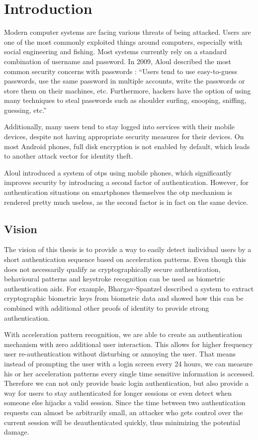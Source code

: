 \chapter{Introduction}\label{chapter:introduction}
Modern computer systems are facing various threats of being attacked. Users are one of the most commonly exploited things around computers, especially with social engineering and fishing. Most systems currently rely on a standard combination of username and password. In 2009, Aloul \etal described the most common security concerns with passwords \cite{aloul2009two}:
``Users tend to use easy-to-guess passwords, use the same password in multiple accounts, write the passwords or store them on their machines, etc. Furthermore, hackers have the option of using many techniques to steal passwords such as shoulder surfing, snooping, sniffing, guessing, etc.''

Additionally, many users tend to stay logged into services with their mobile devices, despite not having appropriate security measures for their devices. On most Android phones, full disk encryption is not enabled by default, which leads to another attack vector for identity theft.

Aloul \etal introduced a system of \glspl{otp} using mobile phones, which significantly improves security by introducing a second factor of authentication. However, for authentication situations on smartphones themselves the \gls{otp} mechanism is rendered pretty much useless, as the second factor is in fact on the same device.

\section{Vision}
The vision of this thesis is to provide a way to easily detect individual users by a short authentication sequence based on acceleration patterns. Even though this does not necessarily qualify as cryptographically secure authentication, behavioural patterns and keystroke recognition can be used as biometric authentication aids. For example, Bhargav-Spantzel \etal \cite{bhargav2006privacy} described a system to extract cryptographic biometric keys from biometric data and showed how this can be combined with additional other proofs of identity to provide strong authentication.

With acceleration pattern recognition, we are able to create an authentication mechanism with zero additional user interaction. This allows for higher frequency user re-authentication without disturbing or annoying the user. That means instead of prompting the user with a login screen every 24 hours, we can measure his or her acceleration patterns every single time sensitive information is accessed. Therefore we can not only provide basic login authentication, but also provide a way for users to stay authenticated for longer sessions or even detect when someone else hijacks a valid session. Since the time between two authentication requests can almost be arbitrarily small, an attacker who gets control over the current session will be deauthenticated quickly, thus minimizing the potential damage.

